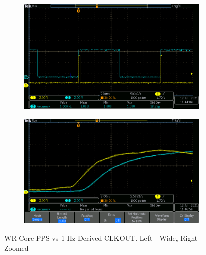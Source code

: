 \documentclass[]{article}
\begin{document}
\begin{figure}[H]
	\begin{subfigure}{0.5\textwidth}
		\includegraphics[width=0.9\linewidth]{images/50M_to_1Hz_wide}
	\end{subfigure}
	\begin{subfigure}{0.5\textwidth}
		\includegraphics[width=0.9\linewidth]{images/50M_to_1Hz_zoom}
	\end{subfigure}
	
	\caption{WR Core PPS vs 1 Hz Derived CLKOUT. Left - Wide, Right - Zoomed}
	\label{50M_clkout}
\end{figure}

\end{document}
